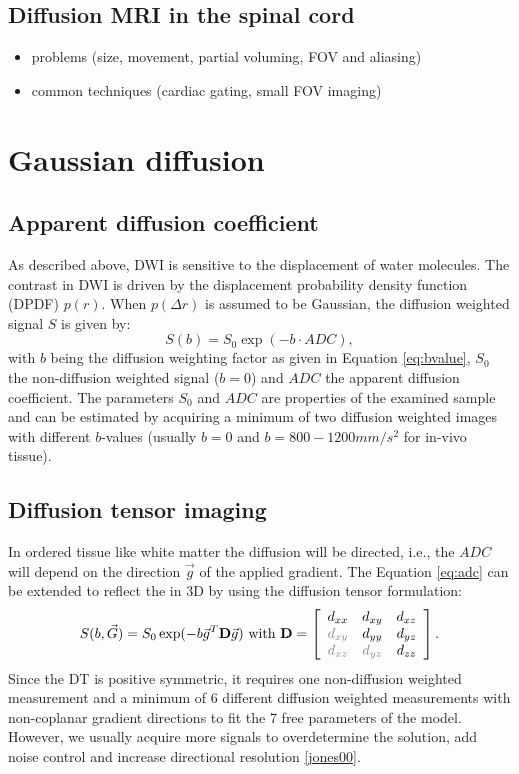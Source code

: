 \subsection*{Diffusion MRI in the spinal cord}
\begin{itemize}
	\item problems (size, movement, partial voluming, FOV and aliasing)
	\item common techniques (cardiac gating, small FOV imaging)
\end{itemize}

\section{Gaussian diffusion}
\subsection*{Apparent diffusion coefficient}
As described above, DWI is sensitive to the displacement of water molecules. The contrast in DWI is driven by the displacement probability density function (DPDF) $p(r)$. When $p(\Delta r)$ is assumed to be Gaussian, the diffusion weighted signal $S$ is given by:
\begin{equation}
	S(b) = S_{0}\exp(-b\cdot ADC),
    \label{eq:adc}
\end{equation}
with $b$ being the diffusion weighting factor as given in Equation \ref{eq:bvalue}, $S_{0}$ the non-diffusion weighted signal ($b=0$) and $ADC$ the apparent diffusion coefficient. The parameters $S_0$ and $ADC$ are properties of the examined sample and can be estimated by acquiring a minimum of two diffusion weighted images with different $b$-values (usually $b=0$ and $b=800-1200mm/s^2$ for in-vivo tissue). 
\subsection*{Diffusion tensor imaging}
In ordered tissue like white matter the diffusion will be directed, i.e., the $ADC$ will depend on the direction $\vec{g}$ of the applied gradient. The Equation \ref{eq:adc} can be extended to reflect the in 3D by using the diffusion tensor formulation:
\begin{equation}
	S(b,\vec{G}) = S_{0}\exp(-b\vec{g}^T \mat{D}\vec{g}) \mbox{ with } \mat{D} = 
	\left[
	\begin{array}{ccc}
	d_{xx} & d_{xy} & d_{xz} \\
	{\color{gray} d_{xy}} & d_{yy} & d_{yz} \\
	{\color{gray} d_{xz}} & {\color{gray} d_{yz}} & d_{zz} 	
	\end{array} \right].	
    \label{eq:dti}
\end{equation}
Since the DT is positive symmetric, it requires one non-diffusion weighted measurement and a minimum of 6 different diffusion weighted measurements with non-coplanar gradient directions to fit the 7 free parameters of the model. However, we usually acquire more signals to overdetermine the solution, add noise control and increase directional resolution \ref{jones00}.

